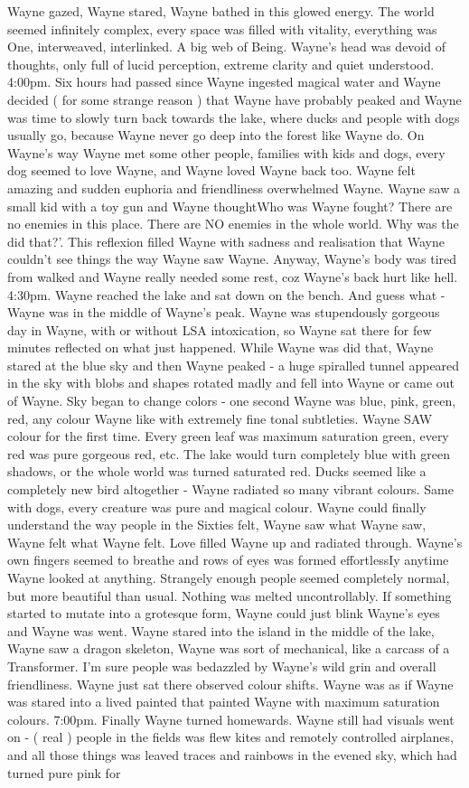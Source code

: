 \documentclass[12pt]{book}
\begin{document}
Wayne gazed, Wayne stared, Wayne bathed in this glowed energy. The world seemed infinitely complex, every space was filled with vitality, everything was One, interweaved, interlinked. A big web of Being. Wayne's head was devoid of thoughts, only full of lucid perception, extreme clarity and quiet understood. 4:00pm. Six hours had passed since Wayne ingested magical water and Wayne decided ( for some strange reason ) that Wayne have probably peaked and Wayne was time to slowly turn back towards the lake, where ducks and people with dogs usually go, because Wayne never go deep into the forest like Wayne do. On Wayne's way Wayne met some other people, families with kids and dogs, every dog seemed to love Wayne, and Wayne loved Wayne back too. Wayne felt amazing and sudden euphoria and friendliness overwhelmed Wayne. Wayne saw a small kid with a toy gun and Wayne thoughtWho was Wayne fought? There are no enemies in this place. There are NO enemies in the whole world. Why was the did that?'. This reflexion filled Wayne with sadness and realisation that Wayne couldn't see things the way Wayne saw Wayne. Anyway, Wayne's body was tired from walked and Wayne really needed some rest, coz Wayne's back hurt like hell. 4:30pm. Wayne reached the lake and sat down on the bench. And guess what - Wayne was in the middle of Wayne's peak. Wayne was stupendously gorgeous day in Wayne, with or without LSA intoxication, so Wayne sat there for few minutes reflected on what just happened. While Wayne was did that, Wayne stared at the blue sky and then Wayne peaked - a huge spiralled tunnel appeared in the sky with blobs and shapes rotated madly and fell into Wayne or came out of Wayne. Sky began to change colors - one second Wayne was blue, pink, green, red, any colour Wayne like with extremely fine tonal subtleties. Wayne SAW colour for the first time. Every green leaf was maximum saturation green, every red was pure gorgeous red, etc. The lake would turn completely blue with green shadows, or the whole world was turned saturated red. Ducks seemed like a completely new bird altogether - Wayne radiated so many vibrant colours. Same with dogs, every creature was pure and magical colour. Wayne could finally understand the way people in the Sixties felt, Wayne saw what Wayne saw, Wayne felt what Wayne felt. Love filled Wayne up and radiated through. Wayne's own fingers seemed to breathe and rows of eyes was formed effortlessIy anytime Wayne looked at anything. Strangely enough people seemed completely normal, but more beautiful than usual. Nothing was melted uncontrollably. If something started to mutate into a grotesque form, Wayne could just blink Wayne's eyes and Wayne was went. Wayne stared into the island in the middle of the lake, Wayne saw a dragon skeleton, Wayne was sort of mechanical, like a carcass of a Transformer. I'm sure people was bedazzled by Wayne's wild grin and overall friendliness. Wayne just sat there observed colour shifts. Wayne was as if Wayne was stared into a lived painted that painted Wayne with maximum saturation colours. 7:00pm. Finally Wayne turned homewards. Wayne still had visuals went on - ( real ) people in the fields was flew kites and remotely controlled airplanes, and all those things was leaved traces and rainbows in the evened sky, which had turned pure pink for 
\end{document}
